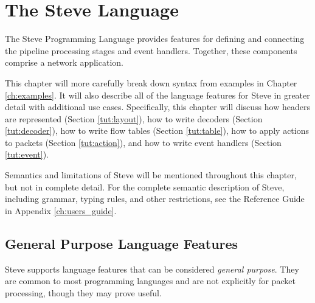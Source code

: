 \chapter{The Steve Language} \label{ch:tutorial}

%

The Steve Programming Language provides features for
defining and connecting the pipeline processing stages and event handlers. Together, these components comprise a network application.

This chapter will more carefully break down syntax from examples in Chapter \ref{ch:examples}. It will also describe all of the language features for Steve in greater detail with additional use cases. 
Specifically, this chapter will discuss how headers are represented (Section \ref{tut:layout}), how to
write decoders (Section \ref{tut:decoder}), how to write flow tables (Section \ref{tut:table}), how to apply actions to packets (Section \ref{tut:action}), and how to write event handlers (Section \ref{tut:event}).

Semantics and limitations of Steve will be mentioned throughout this chapter, 
but not in complete detail. For the complete semantic description of
Steve, including grammar, typing rules, and other restrictions, see the Reference Guide in Appendix \ref{ch:users_guide}.

\section{General Purpose Language Features} \label{tut:gen_purp}

Steve supports language features that can be considered
\textit{general purpose}. They are common to most programming
languages and are not explicitly for packet processing, though they may prove
useful.

